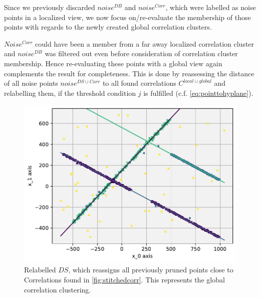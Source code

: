 Since we previously discarded $noise^{DB}$ and $noise^{Corr}$, which were labelled as noise points in a localized view, we now focus on/re-evaluate the membership of those points with regards to the newly created global correlation clusters. 

$Noise^{Corr}$ could have been a member from a far away localized correlation cluster and $noise^{DB}$ was filtered out even before consideration of correlation cluster membership. Hence re-evaluating these points with a global view again complements the result for completeness. This is done by reassessing the distance of all noise points $noise^{DS \cup Corr}$ to all found correlations $C^{local \cup global}$ and relabelling them, if the threshold condition $j$ is fulfilled (c.f. \autoref{eq:pointtohyplane}).\\
\begin{figure}[h]
    \centering
    \includegraphics[width=.7\textwidth]{figure_method_grid/RelabeledCorrelationsWithColoredCorrs.pdf}
    \caption{Relabelled $DS$, which reassigns all previously pruned points close to Correlations found in \autoref{fig:stitchedcorr}. This represents the global correlation clustering.}
    \label{fig:relabelledcorr}
\end{figure}

